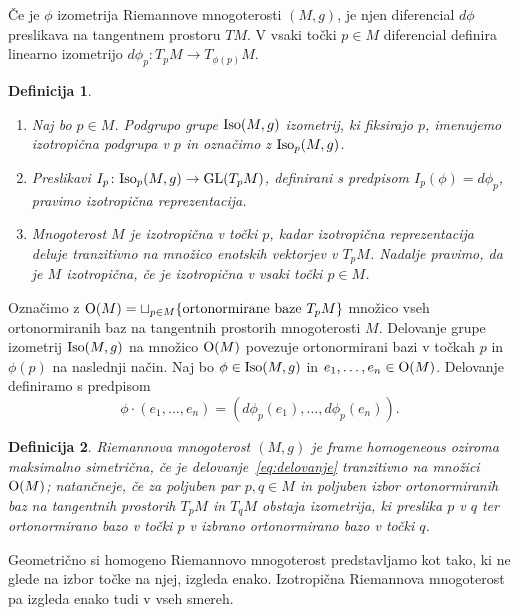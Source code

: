 \documentclass[a4paper]{article}
\newtheorem{definicija}{Definicija}
\begin{document}
Če je $\phi$ izometrija Riemannove mnogoterosti $(M,g)$, je njen diferencial $d\phi$ preslikava na tangentnem prostoru $TM$. V vsaki točki $p \in M$ diferencial definira linearno izometrijo $d\phi_{p} \colon T_{p}M \to T_{\phi(p)}M$.

\begin{definicija}
\begin{enumerate}
\item
Naj bo $p \in M$. Podgrupo grupe $\textup{Iso}(M,g)$ izometrij, ki fiksirajo $p$, imenujemo \emph{izotropična podgrupa} v $p$ in označimo z 
$\textup{Iso}_{p}(M,g)$. 
\item
Preslikavi $I_{p} \colon \textup{Iso}_{p}(M,g) \to \textup{GL}(T_{p}M)$, definirani s predpisom $I_{p}(\phi) = d\phi_{p}$, pravimo \emph{izotropična reprezentacija}.
\item
Mnogoterost $M$ je \emph{izotropična v točki $p$}, kadar izotropična reprezentacija deluje tranzitivno na množico enotskih vektorjev v $T_{p}M$. Nadalje pravimo, da je $M$ \emph{izotropična}, če je izotropična v vsaki točki $p \in M$.
\end{enumerate}
\end{definicija}

Označimo z $\textup{O}(M) = \sqcup_{p \in M} \{ \text{ortonormirane baze} \ T_{p}M \}$ množico vseh ortonormiranih baz na tangentnih prostorih mnogoterosti $M$. Delovanje grupe izometrij $\textup{Iso}(M,g)$ na množico $\textup{O}(M)$ povezuje ortonormirani bazi v točkah $p$ in $\phi(p)$ na naslednji način. Naj bo $\phi \in \textup{Iso}(M,g)$ in ${e_{1}, \dots , e_{n}} \in \textup{O}(M)$. Delovanje definiramo s predpisom
\begin{equation}\label{eq:delovanje}
\phi \cdot (e_{1}, \dots , e_{n}) = (d\phi_{p}(e_{1}), \dots , d\phi_{p}(e_{n})).
\end{equation}

\begin{definicija}
Riemannova mnogoterost $(M,g)$ je \emph{frame homogeneous} oziroma \emph{maksimalno simetrična}, če je delovanje~\ref{eq:delovanje} tranzitivno na množici $\textup{O}(M)$; natančneje, če za poljuben par $p,q \in M$ in poljuben izbor ortonormiranih baz na tangentnih prostorih $T_{p}M$ in $T_{q}M$ obstaja izometrija, ki preslika $p$ v $q$ ter ortonormirano bazo v točki $p$ v izbrano ortonormirano bazo v točki $q$.
\end{definicija}

Geometrično si homogeno Riemannovo mnogoterost predstavljamo kot tako, ki ne glede na izbor točke na njej, izgleda enako.
Izotropična Riemannova mnogoterost pa izgleda enako tudi v vseh smereh.
\end{document}
